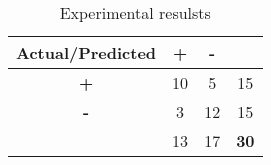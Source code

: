 \begin{table}
  \center
  \begin{tabular}{c|cc|c}
    Actual/Predicted& \textbf{+} & \textbf{-} & \\ \hline
    \textbf{+} & 10 & 5 & 15 \\
    \textbf{-} & 3 & 12 & 15 \\ \hline
    & 13 & 17 & \textbf{30} \\
  \end{tabular}
  \caption{Experimental resulsts}\label{tbl:results}
\end{table}